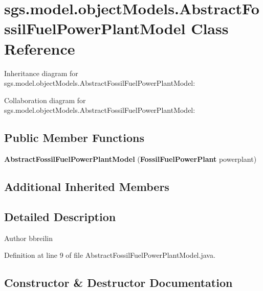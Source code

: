 \section{sgs.\-model.\-object\-Models.\-Abstract\-Fossil\-Fuel\-Power\-Plant\-Model Class Reference}
\label{classsgs_1_1model_1_1object_models_1_1_abstract_fossil_fuel_power_plant_model}


Inheritance diagram for sgs.\-model.\-object\-Models.\-Abstract\-Fossil\-Fuel\-Power\-Plant\-Model\-:


Collaboration diagram for sgs.\-model.\-object\-Models.\-Abstract\-Fossil\-Fuel\-Power\-Plant\-Model\-:
\subsection*{Public Member Functions}
\begin{DoxyCompactItemize}
\item 
{\bf Abstract\-Fossil\-Fuel\-Power\-Plant\-Model} ({\bf Fossil\-Fuel\-Power\-Plant} powerplant)
\end{DoxyCompactItemize}
\subsection*{Additional Inherited Members}


\subsection{Detailed Description}
\begin{DoxyAuthor}{Author}
bbreilin 
\end{DoxyAuthor}


Definition at line 9 of file Abstract\-Fossil\-Fuel\-Power\-Plant\-Model.\-java.



\subsection{Constructor \& Destructor Documentation}
